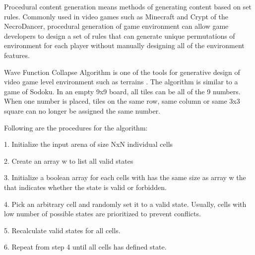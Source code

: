 
Procedural content generation means methods of generating content based on set rules. Commonly used in video games such as Minecraft and Crypt of the NecroDancer, procedural generation of game environment can allow game developers to design a set of rules that can generate unique permutations of environment for each player without manually designing all of the environment features.

Wave Function Collapse Algorithm is one of the tools for generative design of video game level environment such as terrains \cite{moreau_2020}. The algorithm is similar to a game of Sodoku. In an empty 9x9 board, all tiles can be all of the 9 numbers. When one number is placed, tiles on the same row, same column or same 3x3 square can no longer be assigned the same number. 


Following are the procedures for the algorithm:

1. Initialize the input arena of size NxN individual cells

2. Create an array w to list all valid states

3. Initialize a boolean array for each cells with has the same size as array w the that indicates whether the state is valid or forbidden. 

4. Pick an arbitrary cell and randomly set it to a valid state. Usually, cells with low number of possible states are prioritized to prevent conflicts.

5. Recalculate valid states for all cells.

6. Repeat from step 4 until all cells has defined state.

